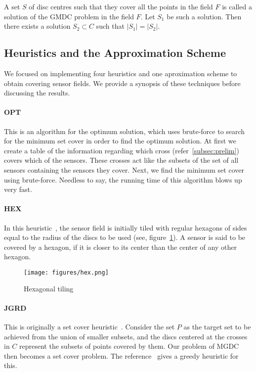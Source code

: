 A set $S$ of disc centres such that they cover all the points in the field $F$ is called a solution of the GMDC problem in the field $F$. Let $S_1$ be such a solution. Then there exists a solution $S_2 \subset C$ such that $|S_1|=|S_2|$.

\subsection{Heuristics and the Approximation Scheme}

We focused on implementing four heuristics and one aproximation scheme to
obtain covering sensor fields. We provide a synopsis of these techniques
before discussing the results.

\paragraph*{OPT} 
This is an algorithm for the optimum solution, which uses brute-force to search for the minimum set cover in order to find the optimum solution. At first we create a table of the information regarding which cross (refer~\ref{subsec:prelim}) covers which of the sensors. These crosses act like the subsets of the set of all sensors containing the sensors they cover. Next, we find the minimum set cover using brute-force. Needless to say, the running time of this algorithm blows up very fast.

\paragraph*{HEX} 
In this heuristic~\cite{hex}, the sensor field is initially tiled with regular hexagons of sides equal to the radius of the discs to be used (see, figure~\ref{fig:hex}). A sensor is said to be covered by a hexagon, if it is closer to its center than the center of any other hexagon.
\begin{center}
\begin{figure}[H]
\texttt{[image: figures/hex.png]}
\caption{Hexagonal tiling}\label{fig:hex}
\end{figure}
\end{center}

\paragraph*{JGRD} 
This is originally a set cover heuristic~\cite{jgreedy}. Consider the set $P$ as the target set to be achieved from the union of smaller subsets, and the discs centered at the crosses in $C$ represent the subsets of points covered by them. Our problem of MGDC then becomes a set cover problem. 
The reference~\cite{jgreedy} gives a greedy heuristic for this.

